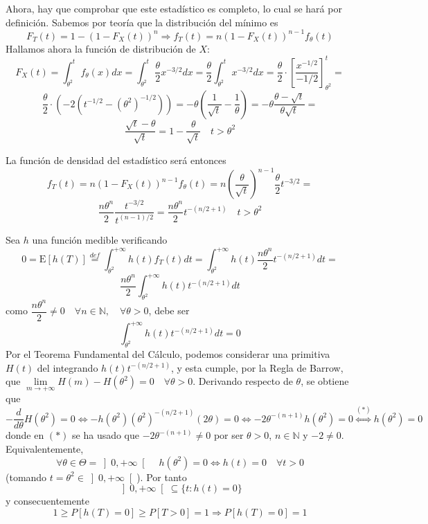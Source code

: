 \documentclass[12pt]{article}
\newcommand{\E}{\mathrm{E}}
\newcommand{\N}{\mathbb{N}}
\begin{document}
\begin{ejercicio}
\begin{enumerate}
            \newpage

            Ahora, hay que comprobar que este estadístico es completo, lo cual se hará por definición. 
            Sabemos por teoría que la distribución del mínimo es 
            $$F_T(t) = 1 - (1 -F_X(t))^n \Longrightarrow f_T(t) = n(1-F_X(t))^{n-1} f_\theta(t)$$
            Hallamos ahora la función de distribución de $X$:
            $$F_X(t) = \int_{\theta^2}^{t} f_\theta(x) dx = \int_{\theta^2}^{t} \dfrac{\theta}{2} x^{-3/2} dx = 
            \dfrac{\theta}{2} \int_{\theta^2}^{t} x^{-3/2} dx = \dfrac{\theta}{2} \cdot 
            \left[ \dfrac{x^{-1/2}}{-1/2} \right]_{\theta^2}^{t} = $$
            $$\dfrac{\theta}{2} \cdot (-2\left(t^{-1/2} - (\theta^2)^{-1/2} \right)) = 
            - \theta \left( \dfrac{1}{\sqrt{t}} - \dfrac{1}{\theta} \right) = -\theta \dfrac{\theta - \sqrt{t}}{\theta \sqrt{t}} = $$
            $$\dfrac{\sqrt{t} - \theta}{\sqrt{t}} = 1 - \dfrac{\theta}{\sqrt{t}} \quad t > \theta^2$$

            La función de densidad del estadístico será entonces
            $$f_T(t) = n(1-F_X(t))^{n-1} f_\theta(t) = 
            n \left(\dfrac{\theta}{\sqrt{t}}\right)^{n-1} \dfrac{\theta}{2} t^{-3/2} = $$
            $$\dfrac{n \theta^n}{2} \dfrac{t^{-3/2}}{t^{(n-1)/2}} = \dfrac{n \theta^n}{2} t^{-(n/2+1)} \quad t > \theta^2$$

            Sea $h$ una función medible verificando $$0 = \E[h(T)] \stackrel{def}{=} \int_{\theta^2}^{+\infty} h(t) f_T(t) dt = 
            \int_{\theta^2}^{+\infty} h(t) \dfrac{n \theta^n}{2} t^{-(n/2+1)} dt =$$
            $$\dfrac{n \theta^n}{2} \int_{\theta^2}^{+\infty} h(t) t^{-(n/2+1)} dt$$
            como $\dfrac{n \theta^n}{2} \neq 0 \quad \forall n \in \N, \quad \forall \theta>0$, debe ser
            $$\int_{\theta^2}^{+\infty} h(t) t^{-(n/2+1)} dt = 0$$
            Por el Teorema Fundamental del Cálculo, podemos considerar una primitiva $H(t)$ del 
            integrando $h(t) t^{-(n/2+1)}$, y esta cumple,
            por la Regla de Barrow, que $\lim\limits_{m \to +\infty} H(m) - H(\theta^2) = 0 \quad \forall \theta > 0$. 
            Derivando respecto de $\theta$, se obtiene que
            $$-\dfrac{d}{d \theta} H(\theta^2) = 0 \iff -h(\theta^2) (\theta^2)^{-(n/2+1)} (2 \theta) = 0 
            \iff -2\theta^{-(n+1)}h(\theta^2) = 0 \stackrel{(*)}{\iff} h(\theta^2) = 0$$
            donde en $(*)$ se ha usado que $-2\theta^{-(n+1)} \neq 0$ por ser $\theta > 0$, $n \in \N$ y $-2 \neq 0$. 
            Equivalentemente, 
            $$\forall \theta \in \Theta = \left]0, + \infty \right[ \quad h(\theta^2) = 0 \iff h(t) = 0 \quad \forall t > 0$$ 
            (tomando $t = \theta^2 \in \left]0, +\infty \right[$).
            Por tanto $$\left]0, +\infty \right[ \subseteq \{t : h(t) = 0\}$$ y consecuentemente 
            $$1 \geqslant P[h(T) = 0] \geqslant P[T > 0] = 1 \Longrightarrow P[h(T) = 0] = 1$$


\end{enumerate}
\end{ejercicio}
\end{document}
